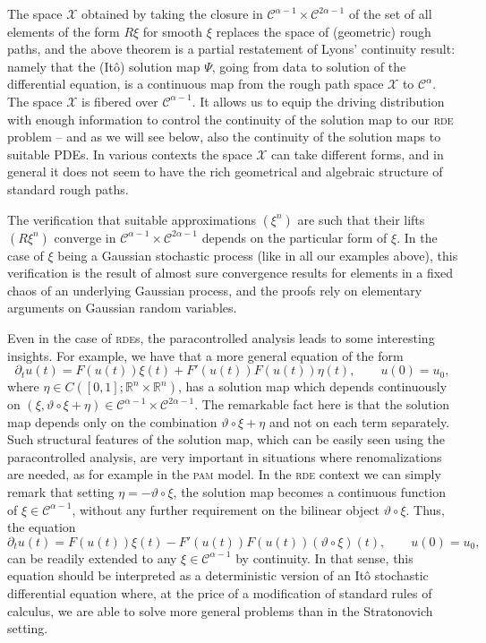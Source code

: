 \documentclass[11pt,a4paper]{article}
\theoremstyle{remark}
\newcommand{\CC}{\ensuremath{\mathscr{C}}}
\begin{document}
The space $\mathcal{X}$ obtained by taking the closure in  $\CC^{\alpha-1}\times\CC^{2\alpha-1}$ of the set of all elements of the form $R\xi$ for smooth $\xi$ replaces the space of (geometric) rough paths, and the above theorem is a partial restatement of Lyons' continuity result: namely that the (It\^o) solution map $\Psi$, going from data to solution of the differential equation, is a continuous map from the rough path space $\mathcal{X}$ to $\CC^\alpha$. The space $\mathcal{X}$ is fibered over $\CC^{\alpha-1}$. It allows us to equip the driving distribution with enough information to control the continuity of the solution map to our \textsc{rde} problem -- and as we will see below, also the continuity of the solution maps to suitable PDEs. In various contexts the space $\mathcal{X}$ can take different forms, and in general it does not seem to have the rich geometrical and algebraic structure of standard rough paths. 

The verification that suitable approximations $(\xi^n)$ are such that their lifts $(R\xi^n)$  converge in $ \CC^{\alpha-1}\times\CC^{2\alpha-1}$ depends on the particular form of $\xi$. In the case of $\xi$ being a Gaussian stochastic process (like in all our examples above), this verification is the result of almost sure convergence results for elements in a fixed chaos of an underlying Gaussian process, and the proofs rely on elementary arguments on Gaussian random variables.   

Even in the case of \textsc{rde}s, the paracontrolled analysis leads to some interesting insights. For example, we have that a more general equation of the form
$$
\partial_t u(t) = F(u(t)) \xi(t) + F'(u(t))F(u(t))\eta(t) ,\qquad
u(0)=u_0,
$$
where $\eta \in C([0,1];\mathbb{R}^n \times \mathbb{R}^n)$,
has a solution map which depends continuously on $(\xi, \vartheta\circ \xi +\eta)\in\CC^{\alpha-1}\times \CC^{2\alpha-1}$. The remarkable fact here is that the solution map depends only on the combination $\vartheta\circ \xi +\eta$ and not on each term separately. Such structural features of the solution map, which can be easily seen using the paracontrolled analysis, are very important in situations where renomalizations are needed, as for example in the \textsc{pam} model. In the \textsc{rde} context we can simply remark that setting $\eta = -\vartheta\circ \xi$, the solution map becomes a continuous function of $\xi \in \CC^{\alpha-1}$, without any further requirement on the bilinear object $\vartheta\circ \xi$. Thus, the equation
$$
\partial_t u(t) = F(u(t)) \xi(t) - F'(u(t))F(u(t))(\vartheta\circ \xi)(t) ,\qquad
u(0)=u_0,
$$
can be readily extended to any $\xi\in\CC^{\alpha-1}$ by continuity. In that sense, this equation should be interpreted as a deterministic version of an It\^o stochastic differential equation where, at the price of a modification of standard rules of calculus, we are able to solve more general problems than in the Stratonovich setting.
\end{document}
